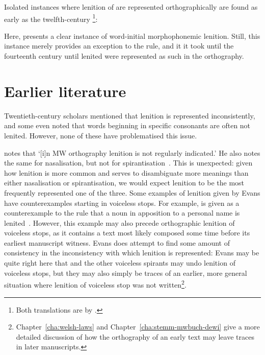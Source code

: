 Isolated instances where lenition of  are represented orthographically are found as early as the twelfth-century \footnote{Both translations are by \textcite[136]{davies_braint_1974}.}:
\begin{mwl}
\end{mwl}
Here,   presents a clear instance of word-initial morphophonemic lenition. Still, this instance merely  provides an exception to the rule, and it it took until the fourteenth century until lenited  were represented as such in the orthography.

\section{Earlier literature}
\label{sec:earlier-literature}
Twentieth-century scholars mentioned that lenition is represented inconsistently, and some even noted that words beginning in specific consonants are often not lenited. However, none of these have problematised this issue.

\Textcite[\S 18]{evans_grammar_1964} notes that `[i]n MW orthography lenition is not regularly indicated.' He also notes the same for nasalisation, but not for spirantisation~\autocite[\S\S 24--25]{evans_grammar_1964}. This is unexpected: given how lenition is  more common and serves to disambiguate more meanings than either nasalisation or spirantisation, we would expect lenition to be the most frequently represented one of the three. Some examples of lenition given by Evans have counterexamples starting in voiceless stops. For example,  is given as a counterexample to the rule that a noun in apposition to a personal name is lenited~\autocite[\S 19]{evans_grammar_1964}. However, this example may also precede orthographic lenition of voiceless stops, as it contains a text most likely composed some time before its earliest manuscript witness. Evans does attempt to find some amount of consistency in the inconsistency with which lenition is represented:
Evans may be quite right here that  and the other voiceless spirants may undo lenition of voiceless stops, but they may also simply be traces of an earlier, more general situation where lenition of voiceless stop was not written\footnote{Chapter~\ref{cha:welsh-laws} and Chapter~\ref{cha:stemm-mwbuch-dewi} give a more detailed discussion of how the orthography of an early text may leave traces in later manuscripts.}.

